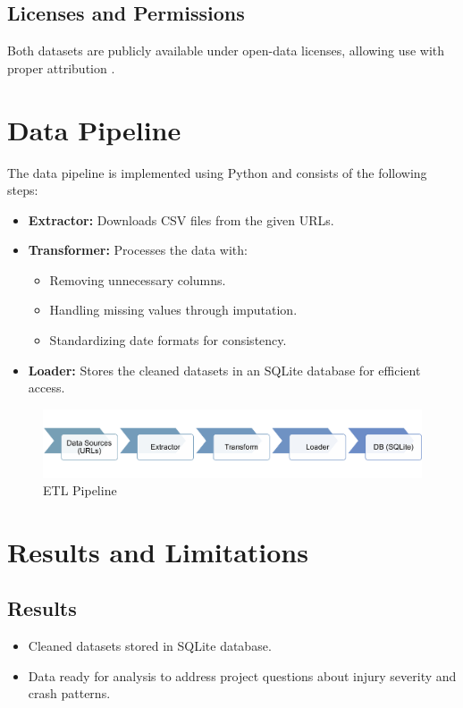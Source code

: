 \documentclass[a4paper,12pt]{article}
\begin{document}
\subsection{Licenses and Permissions}
Both datasets are publicly available under open-data licenses, allowing use with proper attribution \cite{traffic_crashes_people, traffic_crashes_vehicles}.

\section{Data Pipeline}
The data pipeline is implemented using Python and consists of the following steps:
\begin{itemize}
    \item \textbf{Extractor:} Downloads CSV files from the given URLs.
    \item \textbf{Transformer:} Processes the data with:
        \begin{itemize}
            \item Removing unnecessary columns.
            \item Handling missing values through imputation.
            \item Standardizing date formats for consistency.
        \end{itemize}
    \item \textbf{Loader:} Stores the cleaned datasets in an SQLite database for efficient access.
\end{itemize}

\begin{figure}
    \centering
    \includegraphics[width=1\linewidth]{images/Picture1.png}
    \caption{ETL Pipeline}
    \label{fig:ETL-pipeline}
\end{figure}

\section{Results and Limitations}
\subsection{Results}
\begin{itemize}
    \item Cleaned datasets stored in SQLite database.
    \item Data ready for analysis to address project questions about injury severity and crash patterns.
\end{itemize}
\end{document}
